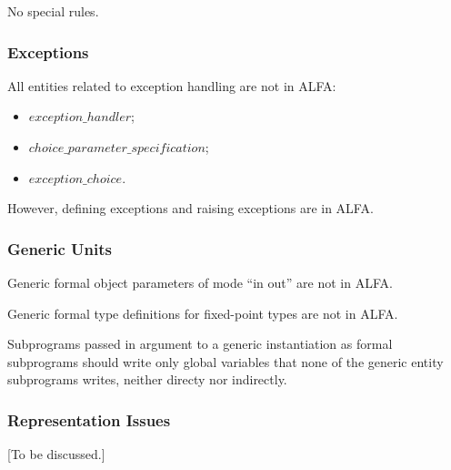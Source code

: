 \documentclass{article}
\newcommand{\bnf}[1]{$\mathit{#1}$}
\begin{document}
No special rules.

\subsubsection{Exceptions}

All entities related to exception handling are not in ALFA:
\begin{itemize}
\item \bnf{exception\_handler};
\item \bnf{choice\_parameter\_specification};
\item \bnf{exception\_choice}.
\end{itemize}

However, defining exceptions and raising exceptions are in ALFA.

\subsubsection{Generic Units}

Generic formal object parameters of mode ``in out'' are not in ALFA.

Generic formal type definitions for fixed-point types are not in ALFA.

Subprograms passed in argument to a generic instantiation as formal subprograms
should write only global variables that none of the generic entity subprograms
writes, neither directy nor indirectly.

\subsubsection{Representation Issues}

[To be discussed.]
\end{document}
